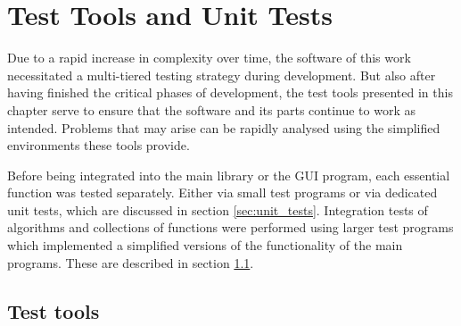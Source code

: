 %
%

\chapter{Test Tools and Unit Tests}
\label{ch:tests}
Due to a rapid increase in complexity over time, the software of this work 
necessitated a multi-tiered testing strategy during development.
But also after having finished the critical phases of development, the test tools presented in this 
chapter serve to ensure that the software and its parts continue to work as intended. 
Problems that may arise can be rapidly analysed using the simplified environments these tools provide.

Before being integrated into the main library or the GUI program, each essential function was tested 
separately. Either via small test programs or via dedicated unit tests, which are discussed in 
section \ref{sec:unit_tests}.
Integration tests of algorithms and collections of functions were performed using larger test programs 
which implemented a simplified versions of the functionality of the main programs.
These are described in section \ref{sec:tests_tools}.



\section{Test tools}
\label{sec:tests_tools}



